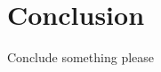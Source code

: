 \documentclass{report}
\begin{document}
\chapter{Conclusion}
Conclude something please
\end{document}
